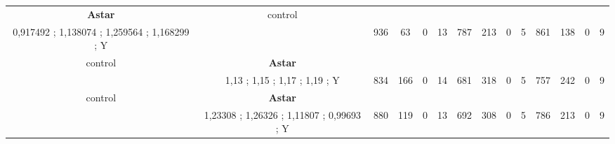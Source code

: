 \begin{table}[]
{\begin{tabular}{|c|c|c|c|c|c|c|c|c|c|c|c|c|c|}
\cellcolor{blue!15}\textbf{Astar} & control& {\color[HTML]{00009B} } & {\color[HTML]{9A0000} } & {\color[HTML]{009901} } &  & {\color[HTML]{00009B} } & {\color[HTML]{9A0000} } & {\color[HTML]{009901} } &  & {\color[HTML]{00009B} } & {\color[HTML]{9A0000} } & {\color[HTML]{009901} } &  \\ 
\cellcolor{ blue!15}0,917492 ; 1,138074 ; 1,259564 ; 1,168299 ; Y &  & \multirow{-2}{*}{{\color[HTML]{00009B} 936}} & \multirow{-2}{*}{{\color[HTML]{9A0000} 63}} & \multirow{-2}{*}{{\color[HTML]{009901} 0}} & \multirow{-2}{*}{13} & \multirow{-2}{*}{{\color[HTML]{00009B} 787}} & \multirow{-2}{*}{{\color[HTML]{9A0000} 213}} & \multirow{-2}{*}{{\color[HTML]{009901} 0}} & \multirow{-2}{*}{5} & \multirow{-2}{*}{{\color[HTML]{00009B} 861}} & \multirow{-2}{*}{{\color[HTML]{9A0000} 138}} & \multirow{-2}{*}{{\color[HTML]{009901} 0}} & \multirow{-2}{*}{9} \\ \hline

control & \cellcolor{blue!15}\textbf{Astar}& {\color[HTML]{00009B} } & {\color[HTML]{9A0000} } & {\color[HTML]{009901} } &  & {\color[HTML]{00009B} } & {\color[HTML]{9A0000} } & {\color[HTML]{009901} } &  & {\color[HTML]{00009B} } & {\color[HTML]{9A0000} } & {\color[HTML]{009901} } &  \\ 
 & \cellcolor{ blue!15}1,13 ; 1,15 ; 1,17 ; 1,19 ; Y & \multirow{-2}{*}{{\color[HTML]{00009B} 834}} & \multirow{-2}{*}{{\color[HTML]{9A0000} 166}} & \multirow{-2}{*}{{\color[HTML]{009901} 0}} & \multirow{-2}{*}{14} & \multirow{-2}{*}{{\color[HTML]{00009B} 681}} & \multirow{-2}{*}{{\color[HTML]{9A0000} 318}} & \multirow{-2}{*}{{\color[HTML]{009901} 0}} & \multirow{-2}{*}{5} & \multirow{-2}{*}{{\color[HTML]{00009B} 757}} & \multirow{-2}{*}{{\color[HTML]{9A0000} 242}} & \multirow{-2}{*}{{\color[HTML]{009901} 0}} & \multirow{-2}{*}{9} \\ \hline

control & \cellcolor{blue!15}\textbf{Astar}& {\color[HTML]{00009B} } & {\color[HTML]{9A0000} } & {\color[HTML]{009901} } &  & {\color[HTML]{00009B} } & {\color[HTML]{9A0000} } & {\color[HTML]{009901} } &  & {\color[HTML]{00009B} } & {\color[HTML]{9A0000} } & {\color[HTML]{009901} } &  \\ 
 & \cellcolor{ blue!15}1,23308 ; 1,26326 ; 1,11807 ; 0,99693 ; Y & \multirow{-2}{*}{{\color[HTML]{00009B} 880}} & \multirow{-2}{*}{{\color[HTML]{9A0000} 119}} & \multirow{-2}{*}{{\color[HTML]{009901} 0}} & \multirow{-2}{*}{13} & \multirow{-2}{*}{{\color[HTML]{00009B} 692}} & \multirow{-2}{*}{{\color[HTML]{9A0000} 308}} & \multirow{-2}{*}{{\color[HTML]{009901} 0}} & \multirow{-2}{*}{5} & \multirow{-2}{*}{{\color[HTML]{00009B} 786}} & \multirow{-2}{*}{{\color[HTML]{9A0000} 213}} & \multirow{-2}{*}{{\color[HTML]{009901} 0}} & \multirow{-2}{*}{9} \\ \hline


\end{tabular}}
\end{table}
